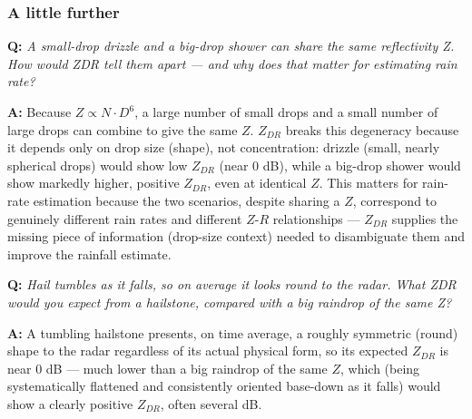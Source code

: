\documentclass[11pt]{article}
\newenvironment{qa}[1]{\par\noindent\textbf{\color{qgray}Q: }\emph{#1}\par\noindent\textbf{A: }}{\par\vspace{6pt}}
\newcommand{\tier}[1]{\subsubsection*{#1}}
\begin{document}
\tier{A little further}
\begin{qa}{A small-drop drizzle and a big-drop shower can share the same reflectivity Z. How would ZDR tell them apart --- and why does that matter for estimating rain rate?}
Because $Z\propto N\cdot D^6$, a large number of small drops and a small number of large drops can combine to give the same $Z$. $Z_{DR}$ breaks this degeneracy because it depends only on drop size (shape), not concentration: drizzle (small, nearly spherical drops) would show low $Z_{DR}$ (near 0 dB), while a big-drop shower would show markedly higher, positive $Z_{DR}$, even at identical $Z$. This matters for rain-rate estimation because the two scenarios, despite sharing a $Z$, correspond to genuinely different rain rates and different $Z$-$R$ relationships --- $Z_{DR}$ supplies the missing piece of information (drop-size context) needed to disambiguate them and improve the rainfall estimate.
\end{qa}
\begin{qa}{Hail tumbles as it falls, so on average it looks round to the radar. What ZDR would you expect from a hailstone, compared with a big raindrop of the same Z?}
A tumbling hailstone presents, on time average, a roughly symmetric (round) shape to the radar regardless of its actual physical form, so its expected $Z_{DR}$ is near $0$ dB --- much lower than a big raindrop of the same $Z$, which (being systematically flattened and consistently oriented base-down as it falls) would show a clearly positive $Z_{DR}$, often several dB.
\end{qa}
\end{document}
